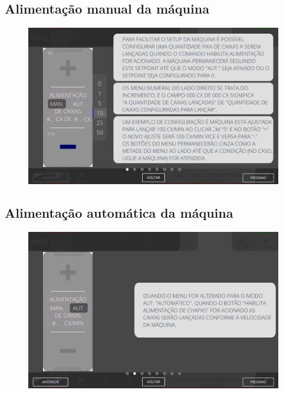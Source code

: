 \subsection{Alimentação manual da máquina}
\vspace*{\fill}
\begin{figure}[h]
    \centering
    \includegraphics[width=576 px,height=360 px]{src/imagesICV/03-feeder/commands/2.png}
\end{figure}
\vspace*{\fill}

\newpage
\thispagestyle{fancy}
\vspace*{40 pt}
\subsection{Alimentação automática da máquina}
\vspace*{\fill}
\begin{figure}[h]
    \centering
    \includegraphics[width=576 px,height=360 px]{src/imagesICV/03-feeder/commands/3.png}
\end{figure}
\vspace*{\fill}


